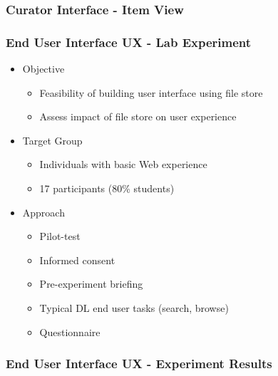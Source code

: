 \documentclass[xcolor=dvitex,t,11pt]{beamer}
\begin{document}
\begin{frame}[fragile]
\frametitle{Curator Interface - Item View}
\begin{figure}
\centering
{}
\end{figure}
\end{frame}

\begin{frame}[fragile]
\frametitle{End User Interface UX - Lab Experiment}
\begin{itemize}
\item Objective
\begin{itemize}
\item Feasibility of building user interface using file store
\item Assess impact of file store on user experience
\end{itemize}
\item Target Group
\begin{itemize}
\item Individuals with basic Web experience
\item 17 participants (80\% students)
\end{itemize}
\item Approach
\begin{itemize}
\item Pilot-test
\item Informed consent
\item Pre-experiment briefing
\item Typical DL end user tasks (search, browse)
\item Questionnaire
\end{itemize}
\end{itemize}
\end{frame}


\begin{frame}[fragile]
\frametitle{End User Interface UX - Experiment Results}
\centering

\end{frame}
\end{document}
